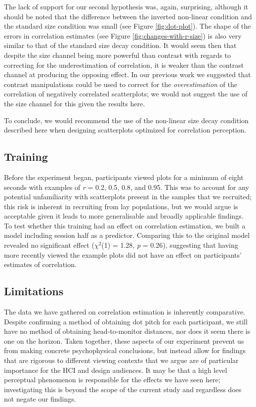 \documentclass{vgtc}                          %
\begin{document}
The lack of support for our second hypothesis was, again, surprising, although it should be noted that the difference between the inverted non-linear condition and the standard size
condition was small (see Figure \ref{fig:dot-plot}). The shape of the errors
in correlation estimates (see Figure \ref{fig:changes-with-r-size}) is also
very similar to that of the standard size decay condition. It would seem then that
despite the size channel being more powerful than contrast with regards to correcting
for the underestimation of correlation, it is weaker than the contrast channel at
producing the opposing effect. In our previous work we suggested that contrast
manipulations could be used to correct for the \emph{overestimation} of the correlation
of negatively correlated scatterplots; we would not suggest the use of the size
channel for this given the results here.

To conclude, we would recommend the use of the non-linear size decay condition described
here when designing scatterplots optimized for correlation perception.

\hypertarget{training}{%
\subsection{Training}\label{training}}

Before the experiment began, participants viewed plots for a minimum of
eight seconds with examples of \emph{r} = 0.2, 0.5, 0.8, and 0.95. This was to account
for any potential unfamiliarity with scatterplots present in the samples
that we recruited; this risk is inherent in recruiting from lay populations, but we
would argue is acceptable given it leads to more generalisable and broadly
applicable findings. To test whether this training had an effect on correlation estimation,
we built a model including session half as a predictor. Comparing this
to the original model revealed no significant effect (\(\chi^2\)(1)
= 1.28, \emph{p} = 0.26),
suggesting that having more recently viewed the example plots did not have an effect
on participants' estimates of correlation.

\hypertarget{limitations}{%
\subsection{Limitations}\label{limitations}}

The data we have gathered on correlation estimation is inherently comparative.
Despite confirming a method of obtaining dot pitch for each
participant, we still have no method of obtaining head-to-monitor distances,
nor does it seem there is one on the horizon. Taken together, these aspects
of our experiment prevent us from making concrete psychophysical conclusions,
but instead allow for findings that are rigorous to different viewing contexts
that we argue are of particular importance for the HCI and design audiences. It
may be that a high level perceptual phenomenon is responsible for the effects
we have seen here; investigating this is beyond the scope of the current study and
regardless does not negate our findings.
\end{document}
